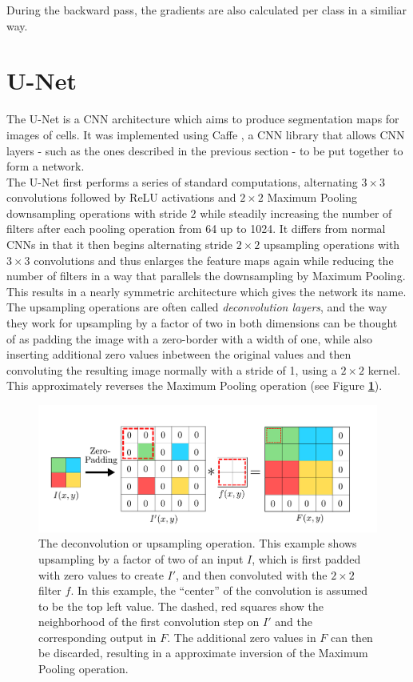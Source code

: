 During the backward pass, the gradients are also calculated per class in a similiar way.


	\section {U-Net}
\label{sec:unet}
The U-Net \cite{unet} is a CNN architecture which aims to produce segmentation maps for images of cells. It was implemented using Caffe \cite{caffe}, a CNN library that allows CNN layers - such as the ones described in the previous section - to be put together to form a network.\\

The U-Net first performs a series of standard computations, alternating $3 \times 3$ convolutions followed by ReLU activations and $2 \times 2$ Maximum Pooling downsampling operations with stride $2$ while steadily increasing the number of filters after each pooling operation from 64 up to 1024. It differs from normal CNNs in that it then begins alternating stride $2 \times 2$ upsampling operations with $3 \times 3$ convolutions and thus enlarges the feature maps again while reducing the number of filters in a way that parallels the downsampling by Maximum Pooling. This results in a nearly symmetric architecture which gives the network its name. The upsampling operations are often called \textit{deconvolution layers}, and the way they work for upsampling by a factor of two in both dimensions can be thought of as padding the image with a zero-border with a width of one, while also inserting additional zero values inbetween the original values and then convoluting the resulting image normally with a stride of 1, using a $2 \times 2$ kernel. This approximately reverses the Maximum Pooling operation (see Figure \textbf{\ref{fig:upconvolution}}). \cite[p. 14]{transposed_conv}\cite{up_conv}

\begin {figure}[!hbt]
	\begin{center}
		\includegraphics[scale=0.50]{img/fig_upconvolution}
	\end{center}
	\caption[Matrix upconvolution.]{The deconvolution or upsampling operation. This example shows upsampling by a factor of two of an input $I$, which is first padded with zero values to create $I'$, and then convoluted with the $2 \times 2$ filter $f$. In this example, the ``center'' of the convolution is assumed to be the top left value. The dashed, red squares show the neighborhood of the first convolution step on $I'$ and the corresponding output in $F$. The additional zero values in $F$ can then be discarded, resulting in a approximate inversion of the Maximum Pooling operation. \footnotemark}
	\label{fig:upconvolution}
\end {figure}

